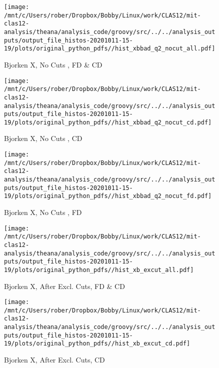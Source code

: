 \documentclass{article}
\begin{document}
\begin{landscape}
    \begin{figure}[h]
        \centering

        \texttt{[image: /mnt/c/Users/rober/Dropbox/Bobby/Linux/work/CLAS12/mit-clas12-analysis/theana/analysis\_code/groovy/src/../../analysis\_outputs/output\_file\_histos-20201011-15-19/plots/original\_python\_pdfs//hist\_xbbad\_q2\_nocut\_all.pdf]}
        \captionsetup{textformat=empty,labelformat=blank}
        \caption{Bjorken X, No Cuts , FD \& CD}
    \end{figure}
    \clearpage
    
    \begin{figure}[h]
        \centering

        \texttt{[image: /mnt/c/Users/rober/Dropbox/Bobby/Linux/work/CLAS12/mit-clas12-analysis/theana/analysis\_code/groovy/src/../../analysis\_outputs/output\_file\_histos-20201011-15-19/plots/original\_python\_pdfs//hist\_xbbad\_q2\_nocut\_cd.pdf]}
        \captionsetup{textformat=empty,labelformat=blank}
        \caption{Bjorken X, No Cuts , CD}
    \end{figure}
    \clearpage
    
    \begin{figure}[h]
        \centering

        \texttt{[image: /mnt/c/Users/rober/Dropbox/Bobby/Linux/work/CLAS12/mit-clas12-analysis/theana/analysis\_code/groovy/src/../../analysis\_outputs/output\_file\_histos-20201011-15-19/plots/original\_python\_pdfs//hist\_xbbad\_q2\_nocut\_fd.pdf]}
        \captionsetup{textformat=empty,labelformat=blank}
        \caption{Bjorken X, No Cuts , FD}
    \end{figure}
    \clearpage
    
    \begin{figure}[h]
        \centering

        \texttt{[image: /mnt/c/Users/rober/Dropbox/Bobby/Linux/work/CLAS12/mit-clas12-analysis/theana/analysis\_code/groovy/src/../../analysis\_outputs/output\_file\_histos-20201011-15-19/plots/original\_python\_pdfs//hist\_xb\_excut\_all.pdf]}
        \captionsetup{textformat=empty,labelformat=blank}
        \caption{Bjorken X, After Excl. Cuts, FD \& CD}
    \end{figure}
    \clearpage
    
    \begin{figure}[h]
        \centering

        \texttt{[image: /mnt/c/Users/rober/Dropbox/Bobby/Linux/work/CLAS12/mit-clas12-analysis/theana/analysis\_code/groovy/src/../../analysis\_outputs/output\_file\_histos-20201011-15-19/plots/original\_python\_pdfs//hist\_xb\_excut\_cd.pdf]}
        \captionsetup{textformat=empty,labelformat=blank}
        \caption{Bjorken X, After Excl. Cuts, CD}
    \end{figure}
    \clearpage
    

\end{landscape}
\end{document}
